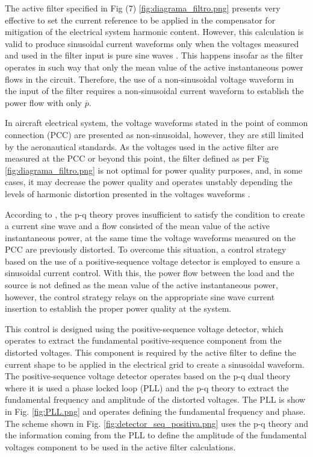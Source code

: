 The active filter specified in Fig (7) \ref{fig:diagrama_filtro.png} presents very effective to set the current reference to be applied in the compensator for mitigation of the electrical system harmonic content. However, this calculation is valid to produce sinusoidal current waveforms only when the voltages measured and used in the filter input is pure sine waves \citep{Akagi2007}. This happens insofar as the filter operates in such way that only the mean value of the active instantaneous power flows in the circuit. Therefore, the use of a non-sinusoidal voltage waveform in the input of the filter requires a non-sinusoidal current waveform to establish the power flow with only $\overline{p}$.

In aircraft electrical system, the voltage waveforms stated in the point of common connection (PCC) are presented as non-sinusoidal, however, they are still limited by the aeronautical standards. As the voltages used in the active filter are measured at the PCC or beyond this point, the filter defined as per Fig \ref{fig:diagrama_filtro.png} is not optimal for power quality purposes, and, in some cases, it may decrease the power quality and operates unstably depending the levels of harmonic distortion presented in the voltages waveforms \citep{Akagi2007}.

According to \citep{Akagi2007}, the p-q theory proves insufficient to satisfy the condition to create a current sine wave and a flow consisted of the mean value of the active instantaneous power, at the same time the voltage waveforms measured on the PCC are previously distorted. To overcome this situation, a control strategy based on the use of a positive-sequence voltage detector is employed to ensure a sinusoidal current control. With this, the power flow between the load and the source is not defined as the mean value of the active instantaneous power, however, the control strategy relays on the appropriate sine wave current insertion to establish the proper power quality at the system.

This control is designed using the positive-sequence voltage detector, which operates to extract the fundamental positive-sequence component from the distorted voltages. This component is required by the active filter to define the current shape to be applied in the electrical grid to create a sinusoidal waveform. 
The positive-sequence voltage detector operates based on the p-q dual theory where it is used a phase locked loop (PLL) and the p-q theory to extract the fundamental frequency and amplitude of the distorted voltages. The PLL is show in Fig. \ref{fig:PLL.png} and operates defining the fundamental frequency and phase. The scheme shown in Fig. \ref{fig:detector_seq_positiva.png} uses the p-q theory and the information coming from the PLL to define the amplitude of the fundamental voltages component to be used in the active filter calculations.


